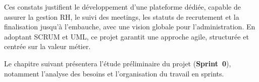 Ces constats justifient le développement d'une plateforme dédiée, capable de
assurer la gestion RH, le suivi des meetings, les statuts de recrutement et
la finalisation jusqu'à l'embauche, avec une vision globale pour
l'administration. En adoptant SCRUM et UML, ce projet garantit une approche
agile, structurée et centrée sur la valeur métier.

Le chapitre suivant présentera l'étude préliminaire du projet
(\textbf{Sprint~0}), notamment l'analyse des besoins et l'organisation du
travail en sprints.

\clearpage
